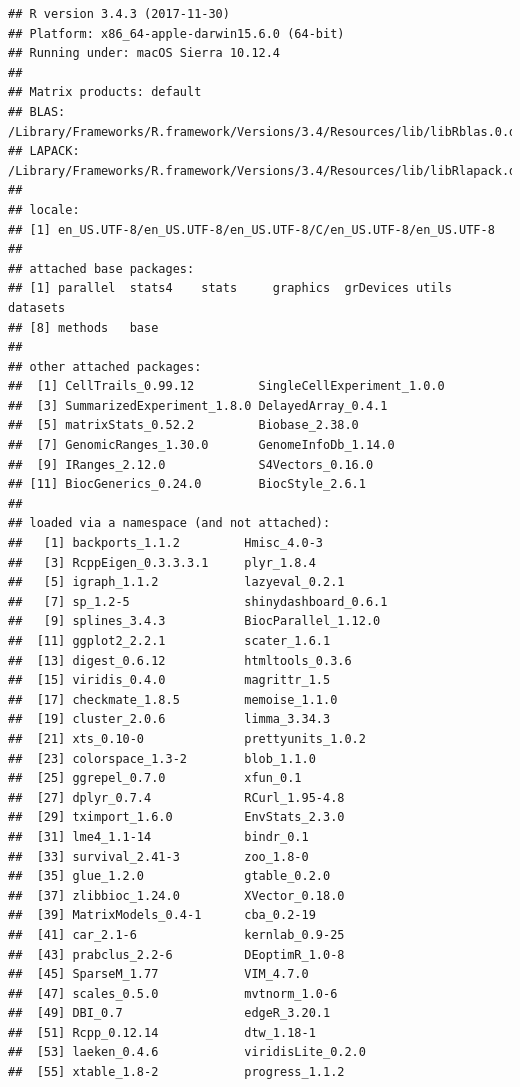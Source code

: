 \documentclass[]{book}
\theoremstyle{definition}
\theoremstyle{definition}
\theoremstyle{definition}
\theoremstyle{remark}
\begin{document}
\begin{verbatim}
## R version 3.4.3 (2017-11-30)
## Platform: x86_64-apple-darwin15.6.0 (64-bit)
## Running under: macOS Sierra 10.12.4
## 
## Matrix products: default
## BLAS: /Library/Frameworks/R.framework/Versions/3.4/Resources/lib/libRblas.0.dylib
## LAPACK: /Library/Frameworks/R.framework/Versions/3.4/Resources/lib/libRlapack.dylib
## 
## locale:
## [1] en_US.UTF-8/en_US.UTF-8/en_US.UTF-8/C/en_US.UTF-8/en_US.UTF-8
## 
## attached base packages:
## [1] parallel  stats4    stats     graphics  grDevices utils     datasets 
## [8] methods   base     
## 
## other attached packages:
##  [1] CellTrails_0.99.12         SingleCellExperiment_1.0.0
##  [3] SummarizedExperiment_1.8.0 DelayedArray_0.4.1        
##  [5] matrixStats_0.52.2         Biobase_2.38.0            
##  [7] GenomicRanges_1.30.0       GenomeInfoDb_1.14.0       
##  [9] IRanges_2.12.0             S4Vectors_0.16.0          
## [11] BiocGenerics_0.24.0        BiocStyle_2.6.1           
## 
## loaded via a namespace (and not attached):
##   [1] backports_1.1.2         Hmisc_4.0-3            
##   [3] RcppEigen_0.3.3.3.1     plyr_1.8.4             
##   [5] igraph_1.1.2            lazyeval_0.2.1         
##   [7] sp_1.2-5                shinydashboard_0.6.1   
##   [9] splines_3.4.3           BiocParallel_1.12.0    
##  [11] ggplot2_2.2.1           scater_1.6.1           
##  [13] digest_0.6.12           htmltools_0.3.6        
##  [15] viridis_0.4.0           magrittr_1.5           
##  [17] checkmate_1.8.5         memoise_1.1.0          
##  [19] cluster_2.0.6           limma_3.34.3           
##  [21] xts_0.10-0              prettyunits_1.0.2      
##  [23] colorspace_1.3-2        blob_1.1.0             
##  [25] ggrepel_0.7.0           xfun_0.1               
##  [27] dplyr_0.7.4             RCurl_1.95-4.8         
##  [29] tximport_1.6.0          EnvStats_2.3.0         
##  [31] lme4_1.1-14             bindr_0.1              
##  [33] survival_2.41-3         zoo_1.8-0              
##  [35] glue_1.2.0              gtable_0.2.0           
##  [37] zlibbioc_1.24.0         XVector_0.18.0         
##  [39] MatrixModels_0.4-1      cba_0.2-19             
##  [41] car_2.1-6               kernlab_0.9-25         
##  [43] prabclus_2.2-6          DEoptimR_1.0-8         
##  [45] SparseM_1.77            VIM_4.7.0              
##  [47] scales_0.5.0            mvtnorm_1.0-6          
##  [49] DBI_0.7                 edgeR_3.20.1           
##  [51] Rcpp_0.12.14            dtw_1.18-1             
##  [53] laeken_0.4.6            viridisLite_0.2.0      
##  [55] xtable_1.8-2            progress_1.1.2         

\end{verbatim}
\end{document}
